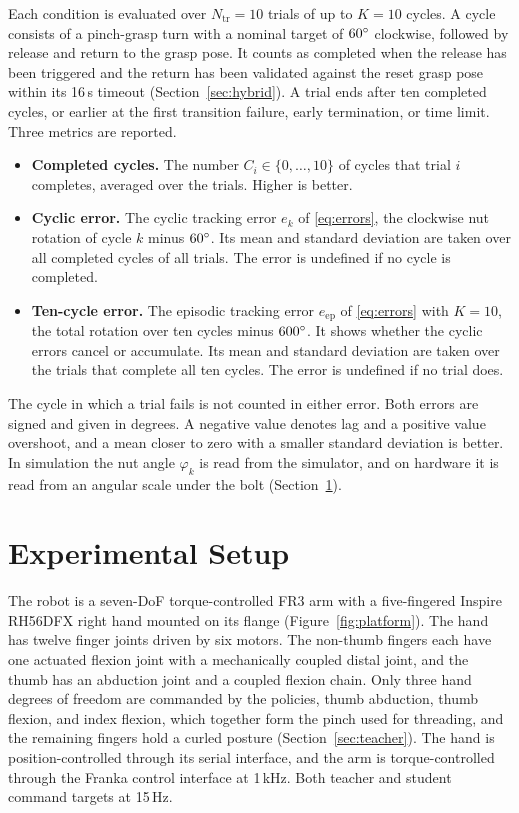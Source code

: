 Each condition is evaluated over $N_{\mathrm{tr}}=10$ trials of up to $K=10$ cycles. A cycle consists of a pinch-grasp turn with a nominal target of $60^\circ$ clockwise, followed by release and return to the grasp pose. It counts as completed when the release has been triggered and the return has been validated against the reset grasp pose within its 16\,s timeout (Section~\ref{sec:hybrid}). A trial ends after ten completed cycles, or earlier at the first transition failure, early termination, or time limit. Three metrics are reported.
\begin{itemize}
  \item \textbf{Completed cycles.} The number $C_i\in\{0,\dots,10\}$ of cycles that trial $i$ completes, averaged over the trials. Higher is better.
  \item \textbf{Cyclic error.} The cyclic tracking error $e_k$ of \eqref{eq:errors}, the clockwise nut rotation of cycle $k$ minus $60^\circ$. Its mean and standard deviation are taken over all completed cycles of all trials. The error is undefined if no cycle is completed.
  \item \textbf{Ten-cycle error.} The episodic tracking error $e_{\mathrm{ep}}$ of \eqref{eq:errors} with $K=10$, the total rotation over ten cycles minus $600^\circ$. It shows whether the cyclic errors cancel or accumulate. Its mean and standard deviation are taken over the trials that complete all ten cycles. The error is undefined if no trial does.
\end{itemize}
The cycle in which a trial fails is not counted in either error. Both errors are signed and given in degrees. A negative value denotes lag and a positive value overshoot, and a mean closer to zero with a smaller standard deviation is better. In simulation the nut angle $\varphi_k$ is read from the simulator, and on hardware it is read from an angular scale under the bolt (Section~\ref{sec:setup}).

\section{Experimental Setup}\label{sec:setup}

The robot is a seven-DoF torque-controlled \ac{FR3} arm with a five-fingered Inspire RH56DFX right hand mounted on its flange (Figure~\ref{fig:platform}). The hand has twelve finger joints driven by six motors. The non-thumb fingers each have one actuated flexion joint with a mechanically coupled distal joint, and the thumb has an abduction joint and a coupled flexion chain. Only three hand degrees of freedom are commanded by the policies, thumb abduction, thumb flexion, and index flexion, which together form the pinch used for threading, and the remaining fingers hold a curled posture (Section~\ref{sec:teacher}). The hand is position-controlled through its serial interface, and the arm is torque-controlled through the Franka control interface at 1\,kHz. Both teacher and student command targets at 15\,Hz.

